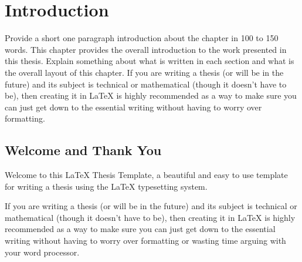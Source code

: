 
\chapter{Introduction} %

\label{Chapter1} %


\newcommand{\keyword}[1]{\textbf{#1}}
\newcommand{\tabhead}[1]{\textbf{#1}}
\newcommand{\code}[1]{\texttt{#1}}
\newcommand{\file}[1]{\texttt{\bfseries#1}}
\newcommand{\option}[1]{\texttt{\itshape#1}}

Provide a short one paragraph introduction about the chapter in 100 to 150  words. This chapter provides the overall introduction to the work presented in this thesis. Explain something about what is written in each section and what is the overall layout of this chapter. If you are writing a thesis (or will be in the future) and its subject is technical or mathematical (though it doesn't have to be), then creating it in \LaTeX{} is highly recommended as a way to make sure you can just get down to the essential writing without having to worry over formatting.




\section{Welcome and Thank You}
Welcome to this \LaTeX{} Thesis Template, a beautiful and easy to use template for writing a thesis using the \LaTeX{} typesetting system.

If you are writing a thesis (or will be in the future) and its subject is technical or mathematical (though it doesn't have to be), then creating it in \LaTeX{} is highly recommended as a way to make sure you can just get down to the essential writing without having to worry over formatting or wasting time arguing with your word processor.

